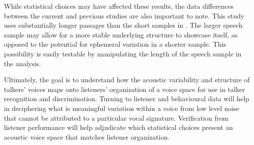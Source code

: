 While statistical choices may have affected these results, the data differences between the current and previous studies are also important to note. This study uses substantially longer passages than the short samples in \citet{lee_2019_acoustic}. The larger speech sample may allow for a more stable underlying structure to showcase itself, as opposed to the potential for ephemeral variation in a shorter sample. This possibility is easily testable by manipulating the length of the speech sample in the analysis.

Ultimately, the goal is to understand how the acoustic variability and structure of talkers' voices maps onto listeners' organization of a voice space for use in talker recognition and discrimination. Turning to listener and behavioural data will help in deciphering what is meaningful variation within a voice from low level noise that cannot be attributed to a particular vocal signature. Verification from listener performance will help adjudicate which statistical choices present an acoustic voice space that matches listener organization. 

\endinput %
